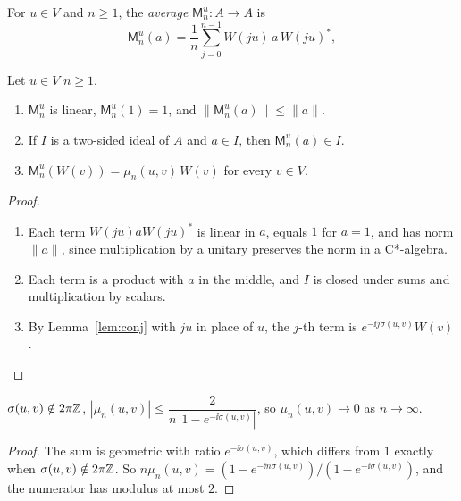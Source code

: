 \begin{definition}[Average]\label{def:average}
For $u\in V$ and $n\geq1$, the \emph{average} $\mathsf M^u_n:A\to A$ is
\[
\mathsf M^u_n(a)=\frac1n\sum_{j=0}^{n-1}W(ju)\,a\,W(ju)^*,
\]
\end{definition}
\noindent{}

\begin{lemma}\label{lem:average}
Let  $u\in V$\revk{,} $n\geq1$.
\begin{enumerate}[label=(\alph*),leftmargin=2.5em]
\item $\mathsf M^u_n$ is linear, $\mathsf M^u_n(1)=1$, and $\|\mathsf M^u_n(a)\|\leq\|a\|$.
\item If $I$ is a two-sided ideal of $A$ and $a\in I$, then $\mathsf M^u_n(a)\in I$.
\item $\mathsf M^u_n(W(v))=\mu_n(u,v)\,W(v)$ for every $v\in V$.
\end{enumerate}
\end{lemma}
\begin{proof}
\begin{enumerate}[leftmargin=2.5em]
\item[(a)] Each term $W(ju)aW(ju)^*$ is linear in $a$, equals $1$ for $a=1$, and has norm $\|a\|$,
since multiplication by a unitary preserves the norm in a C*-algebra.
\item[(b)] Each term is a product with $a$ in the middle, and $I$ is closed under sums and
multiplication by scalars.
\item[(c)] By Lemma~\ref{lem:conj} with $ju$ in place of $u$, the $j$-th term is
$e^{-\ii j\sigma(u,v)}W(v)$.
\end{enumerate}
\end{proof}

\begin{lemma}\label{lem:phases}
 $\sigma(u,v)\notin2\pi\mathbb Z$, 
$|\mu_n(u,v)|\leq\dfrac{2}{n\,|1-e^{-\ii\sigma(u,v)}|}$, so $\mu_n(u,v)\to0$ as $n\to\infty$.
\end{lemma}
\begin{proof}
The sum is geometric with ratio $e^{-\ii\sigma(u,v)}$, which differs from $1$ exactly when
$\sigma(u,v)\notin2\pi\mathbb Z$. So $n\mu_n(u,v)=(1-e^{-\ii n\sigma(u,v)})/(1-e^{-\ii\sigma(u,v)})$,
and the numerator has modulus at most $2$.
\end{proof}

